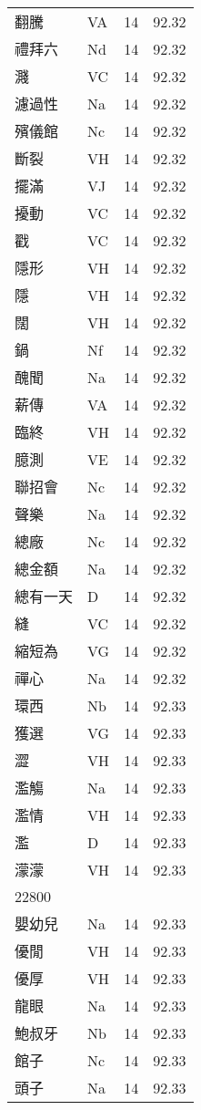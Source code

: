 \documentclass[twocolumn]{book}
\begin{document}
\begin{supertabular}{llrr}
翻騰 & VA & 14 &  92.32\\
禮拜六 & Nd & 14 &  92.32\\
濺 & VC & 14 &  92.32\\
濾過性 & Na & 14 &  92.32\\
殯儀館 & Nc & 14 &  92.32\\
斷裂 & VH & 14 &  92.32\\
擺滿 & VJ & 14 &  92.32\\
擾動 & VC & 14 &  92.32\\
戳 & VC & 14 &  92.32\\
隱形 & VH & 14 &  92.32\\
隱 & VH & 14 &  92.32\\
闊 & VH & 14 &  92.32\\
鍋 & Nf & 14 &  92.32\\
醜聞 & Na & 14 &  92.32\\
薪傳 & VA & 14 &  92.32\\
臨終 & VH & 14 &  92.32\\
臆測 & VE & 14 &  92.32\\
聯招會 & Nc & 14 &  92.32\\
聲樂 & Na & 14 &  92.32\\
總廠 & Nc & 14 &  92.32\\
總金額 & Na & 14 &  92.32\\
總有一天 & D & 14 &  92.32\\
縫 & VC & 14 &  92.32\\
縮短為 & VG & 14 &  92.32\\
禪心 & Na & 14 &  92.32\\
環西 & Nb & 14 &  92.33\\
獲選 & VG & 14 &  92.33\\
澀 & VH & 14 &  92.33\\
濫觴 & Na & 14 &  92.33\\
濫情 & VH & 14 &  92.33\\
濫 & D & 14 &  92.33\\
濛濛 & VH & 14 &  92.33\\
22800\\
嬰幼兒 & Na & 14 &  92.33\\
優閒 & VH & 14 &  92.33\\
優厚 & VH & 14 &  92.33\\
龍眼 & Na & 14 &  92.33\\
鮑叔牙 & Nb & 14 &  92.33\\
館子 & Nc & 14 &  92.33\\
頭子 & Na & 14 &  92.33\\

\end{supertabular}
\end{document}
